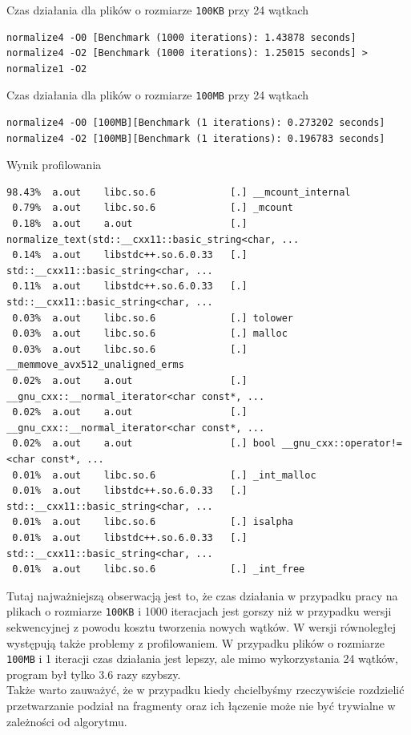 \documentclass[12pt]{article}
\begin{document}
Czas działania dla plików o rozmiarze \verb|100KB| przy 24 wątkach
\begin{verbatim}
normalize4 -O0 [Benchmark (1000 iterations): 1.43878 seconds]
normalize4 -O2 [Benchmark (1000 iterations): 1.25015 seconds] > normalize1 -O2
\end{verbatim}

Czas działania dla plików o rozmiarze \verb|100MB| przy 24 wątkach
\begin{verbatim}
normalize4 -O0 [100MB][Benchmark (1 iterations): 0.273202 seconds]
normalize4 -O2 [100MB][Benchmark (1 iterations): 0.196783 seconds]
\end{verbatim}

Wynik profilowania
\begin{verbatim}
98.43%  a.out    libc.so.6             [.] __mcount_internal 
 0.79%  a.out    libc.so.6             [.] _mcount 
 0.18%  a.out    a.out                 [.] normalize_text(std::__cxx11::basic_string<char, ...
 0.14%  a.out    libstdc++.so.6.0.33   [.] std::__cxx11::basic_string<char, ...
 0.11%  a.out    libstdc++.so.6.0.33   [.] std::__cxx11::basic_string<char, ...
 0.03%  a.out    libc.so.6             [.] tolower 
 0.03%  a.out    libc.so.6             [.] malloc 
 0.03%  a.out    libc.so.6             [.] __memmove_avx512_unaligned_erms 
 0.02%  a.out    a.out                 [.] __gnu_cxx::__normal_iterator<char const*, ...
 0.02%  a.out    a.out                 [.] __gnu_cxx::__normal_iterator<char const*, ...
 0.02%  a.out    a.out                 [.] bool __gnu_cxx::operator!=<char const*, ...
 0.01%  a.out    libc.so.6             [.] _int_malloc 
 0.01%  a.out    libstdc++.so.6.0.33   [.] std::__cxx11::basic_string<char, ...
 0.01%  a.out    libc.so.6             [.] isalpha 
 0.01%  a.out    libstdc++.so.6.0.33   [.] std::__cxx11::basic_string<char, ...
 0.01%  a.out    libc.so.6             [.] _int_free 
\end{verbatim}

Tutaj najważniejszą obserwacją jest to, że czas działania w przypadku pracy na plikach
o rozmiarze \verb|100KB| i 1000 iteracjach jest gorszy niż w przypadku wersji
sekwencyjnej z powodu kosztu tworzenia nowych wątków. W wersji równoległej występują także
problemy z profilowaniem. 
W przypadku plików o rozmiarze \verb|100MB| i 1 iteracji czas działania jest lepszy, ale
mimo wykorzystania 24 wątków, program był tylko $3.6$ razy szybszy. \\
Także warto zauważyć, że w przypadku kiedy chcielbyśmy rzeczywiście rozdzielić przetwarzanie 
podział na fragmenty oraz ich łączenie może nie być trywialne w zależności od algorytmu. 
\end{document}
